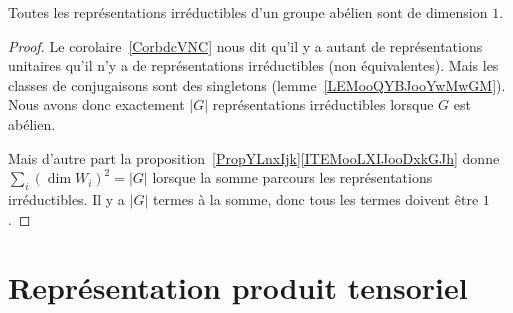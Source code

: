 \begin{corollary}       \label{CORooWAGXooByrelO}
	Toutes les représentations irréductibles d'un groupe abélien sont de dimension \( 1\).
\end{corollary}

\begin{proof}
	Le corolaire~\ref{CorbdcVNC} nous dit qu'il y a autant de représentations unitaires qu'il n'y a de représentations irréductibles (non équivalentes). Mais les classes de conjugaisons sont des singletons (lemme~\ref{LEMooQYBJooYwMwGM}). Nous avons donc exactement \( | G |\) représentations irréductibles lorsque \( G\) est abélien.

	Mais d'autre part la proposition~\ref{PropYLnxIjk}\ref{ITEMooLXIJooDxkGJh} donne \( \sum_i(\dim W_i)^2=| G |\) lorsque la somme parcours les représentations irréductibles. Il y a \( | G |\) termes à la somme, donc tous les termes doivent être \( 1\).
\end{proof}

\section{Représentation produit tensoriel}

